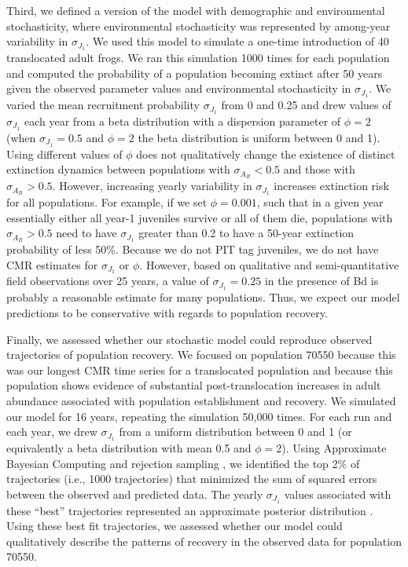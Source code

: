 \documentclass[9pt,twoside,lineno]{pnas-new-SI}
\begin{document}
Third, we defined a version of the model with demographic and
environmental stochasticity, where environmental stochasticity was
represented by among-year variability in \(\sigma_{J_1}\). We used this
model to simulate a one-time introduction of 40 translocated adult
frogs. We ran this simulation 1000 times for each population and
computed the probability of a population becoming extinct after 50 years
given the observed parameter values and environmental stochasticity in
\(\sigma_{J_1}\). We varied the mean recruitment probability
\(\sigma_{J_1}\) from 0 and 0.25 and drew values of \(\sigma_{J_1}\)
each year from a beta distribution with a dispersion parameter of
\(\phi = 2\) (when \(\sigma_{J_1} = 0.5\) and \(\phi = 2\) the beta
distribution is uniform between 0 and 1). Using different values of
\(\phi\) does not qualitatively change the existence of distinct
extinction dynamics between populations with \(\sigma_{A_R} < 0.5\) and
those with \(\sigma_{A_R} > 0.5\). However, increasing yearly
variability in \(\sigma_{J_1}\) increases extinction risk for all
populations. For example, if we set \(\phi = 0.001\), such that in a
given year essentially either all year-1 juveniles survive or all of
them die, populations with \(\sigma_{A_R} > 0.5\) need to have
\(\sigma_{J_1}\) greater than 0.2 to have a 50-year extinction
probability of less 50\%. Because we do not PIT tag juveniles, we do not
have CMR estimates for \(\sigma_{J_1}\) or \(\phi\). However, based on
qualitative and semi-quantitative field observations over 25 years, a
value of \(\sigma_{J_1} = 0.25\) in the presence of Bd is probably a
reasonable estimate for many populations. Thus, we expect our model
predictions to be conservative with regards to population recovery.

Finally, we assessed whether our stochastic model could reproduce
observed trajectories of population recovery. We focused on population
70550 because this was our longest CMR time series for a translocated
population and because this population shows evidence of substantial
post-translocation increases in adult abundance associated with
population establishment and recovery. We simulated our model for 16
years, repeating the simulation 50,000 times. For each run and each
year, we drew \(\sigma_{J_1}\) from a uniform distribution between 0 and
1 (or equivalently a beta distribution with mean 0.5 and \(\phi = 2\)).
Using Approximate Bayesian Computing and rejection sampling
\citep{kosmala2016}, we identified the top 2\% of trajectories (i.e.,
1000 trajectories) that minimized the sum of squared errors between the
observed and predicted data. The yearly \(\sigma_{J_1}\) values
associated with these ``best'' trajectories represented an approximate
posterior distribution \citep{beaumont2010}. Using these best fit
trajectories, we assessed whether our model could qualitatively describe
the patterns of recovery in the observed data for population 70550.
\end{document}
